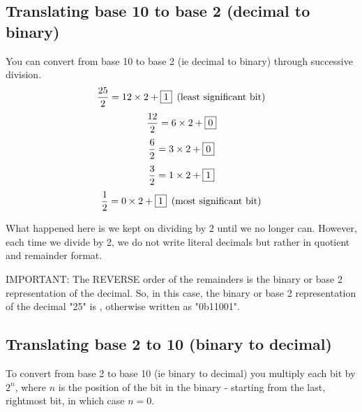 \documentclass{article}
\begin{document}
\subsection{Translating base 10 to base 2 (decimal to binary)}

You can convert from base 10 to base 2 (ie decimal to binary) through successive division.
$$\frac{25}{2}=12\times2+\fbox{1}\phantom{1}\text{(least significant bit)}$$
$$\frac{12}{2}=6\times2+\fbox{0}$$
$$\frac{6}{2}=3\times2+\fbox{0}$$
$$\frac{3}{2}=1\times2+\fbox{1}$$
$$\frac{1}{2}=0\times2+\fbox{1}\phantom{1}\text{(most significant bit)}$$

\vspace{\baselineskip}
\noindent What happened here is we kept on dividing by 2 until we no longer can. However, each time we divide by 2, we do not write literal decimals but rather in quotient and remainder format.

\begin{center}
    IMPORTANT: The REVERSE order of the remainders is the binary or base 2 representation of the decimal. So, in this case, the binary or base 2 representation of the decimal "25" is , otherwise written as "0b11001".
\end{center}

\subsection{Translating base 2 to 10 (binary to decimal)}
To convert from base 2 to base 10 (ie binary to decimal) you multiply each bit by $2^n$, where $n$ is the position of the bit in the binary - starting from the last, rightmost bit, in which case $n=0$.
\end{document}
